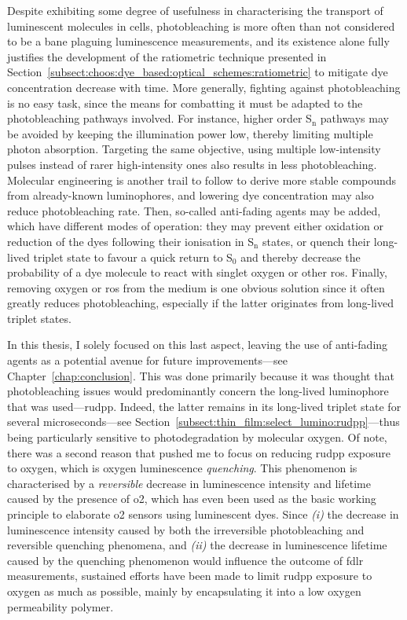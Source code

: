 Despite exhibiting some degree of usefulness in characterising the transport of luminescent molecules in cells\cite{axelrod1976}, photobleaching is more often than not considered to be a bane plaguing luminescence measurements, and its existence alone fully justifies the development of the ratiometric technique presented in Section~\ref{subsect:choos:dye_based:optical_schemes:ratiometric} to mitigate dye concentration decrease with time. More generally, fighting against photobleaching is no easy task, since the means for combatting it must be adapted to the photobleaching pathways involved. For instance, higher order S$_\text{n}$ pathways may be avoided by keeping the illumination power low, thereby limiting multiple photon absorption\cite{widengren1996, diaspro2006}. Targeting the same objective, using multiple low-intensity pulses instead of rarer high-intensity ones also results in less photobleaching\cite{donnert2007, ji2008}. Molecular engineering is another trail to follow to derive more stable compounds from already-known luminophores\cite{sun1997}, and lowering dye concentration may also reduce photobleaching rate\cite{song1997}. Then, so-called anti-fading agents may be added, which have different modes of operation: they may prevent either oxidation or reduction of the dyes following their ionisation in S$_\text{n}$ states, or quench their long-lived triplet state to favour a quick return to S$_0$ and thereby decrease the probability of a dye molecule to react with singlet oxygen or other \gls{ros}\cite{diaspro2006}. Finally, removing oxygen or \gls{ros} from the medium is one obvious solution since it often greatly reduces photobleaching, especially if the latter originates from long-lived triplet states\cite{song1995, widengren1996}.

In this thesis, I solely focused on this last aspect, leaving the use of anti-fading agents as a potential avenue for future improvements---see Chapter~\ref{chap:conclusion}. This was done primarily because it was thought that photobleaching issues would predominantly concern the long-lived luminophore that was used---\gls{rudpp}. Indeed, the latter remains in its long-lived triplet state for several microseconds---see Section~\ref{subsect:thin_film:select_lumino:rudpp}---thus being particularly sensitive to photodegradation by molecular oxygen. Of note, there was a second reason that pushed me to focus on reducing \gls{rudpp} exposure to oxygen, which is oxygen luminescence \emph{quenching}. This phenomenon is characterised by a \emph{reversible} decrease in luminescence intensity and lifetime caused by the presence of \gls{o2}\cite{cabrerizo2010}, which has even been used as the basic working principle to elaborate \gls{o2} sensors using luminescent dyes\cite{amao2003}. Since \textit{(i)} the decrease in luminescence intensity caused by both the irreversible photobleaching and reversible quenching phenomena, and \textit{(ii)} the decrease in luminescence lifetime caused by the quenching phenomenon would influence the outcome of \gls{fdlr} measurements, sustained efforts have been made to limit \gls{rudpp} exposure to oxygen as much as possible, mainly by encapsulating it into a low oxygen permeability polymer.

